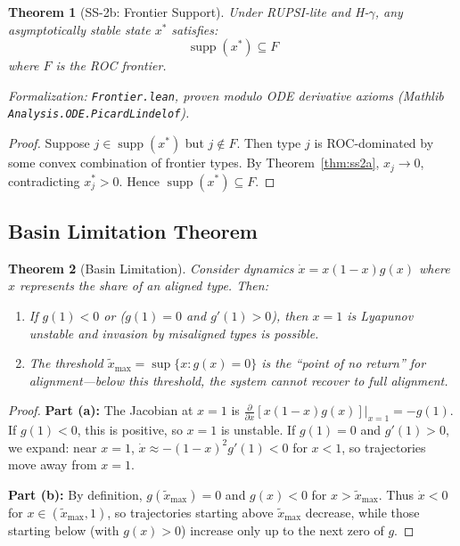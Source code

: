 \documentclass[12pt]{article}
\newtheorem{theorem}{Theorem}[section]
\DeclareMathOperator{\supp}{supp}
\begin{document}
\begin{theorem}[SS-2b: Frontier Support]
\label{thm:ss2b}
Under RUPSI-lite and H-$\gamma$, any asymptotically stable state $x^*$ satisfies:
\[
\supp(x^*) \subseteq F
\]
where $F$ is the ROC frontier.
\end{theorem}
\noindent\textit{Formalization: \texttt{Frontier.lean}, proven modulo ODE derivative axioms (Mathlib \texttt{Analysis.ODE.PicardLindelof}).}

\begin{proof}
Suppose $j \in \supp(x^*)$ but $j \notin F$. Then type $j$ is ROC-dominated by some convex combination of frontier types. By Theorem~\ref{thm:ss2a}, $x_j \to 0$, contradicting $x^*_j > 0$. Hence $\supp(x^*) \subseteq F$.
\end{proof}

\subsection{Basin Limitation Theorem}

\begin{theorem}[Basin Limitation]
\label{thm:basin}
Consider dynamics $\dot{x} = x(1-x)g(x)$ where $x$ represents the share of an aligned type. Then:
\begin{enumerate}
    \item[(a)] If $g(1) < 0$ or ($g(1) = 0$ and $g'(1) > 0$), then $x = 1$ is Lyapunov unstable and invasion by misaligned types is possible.
    
    \item[(b)] The threshold $\tilde{x}_{\max} = \sup\{x : g(x) = 0\}$ is the ``point of no return'' for alignment---below this threshold, the system cannot recover to full alignment.
\end{enumerate}
\end{theorem}

\begin{proof}
\textbf{Part (a):} The Jacobian at $x = 1$ is $\frac{\partial}{\partial x}[x(1-x)g(x)]|_{x=1} = -g(1)$. If $g(1) < 0$, this is positive, so $x = 1$ is unstable. If $g(1) = 0$ and $g'(1) > 0$, we expand: near $x = 1$, $\dot{x} \approx -(1-x)^2 g'(1) < 0$ for $x < 1$, so trajectories move away from $x = 1$.

\textbf{Part (b):} By definition, $g(\tilde{x}_{\max}) = 0$ and $g(x) < 0$ for $x > \tilde{x}_{\max}$. Thus $\dot{x} < 0$ for $x \in (\tilde{x}_{\max}, 1)$, so trajectories starting above $\tilde{x}_{\max}$ decrease, while those starting below (with $g(x) > 0$) increase only up to the next zero of $g$.
\end{proof}
\end{document}
